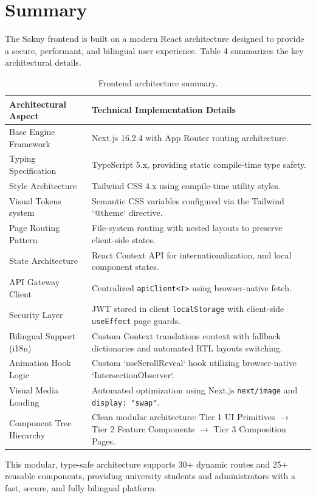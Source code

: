 \documentclass[12pt,a4paper]{article}
\begin{document}
\section{Summary}

The Sakny frontend is built on a modern React architecture designed to provide a secure, performant, and bilingual user experience. Table 4 summarizes the key architectural details.

\begin{table}[H]
\centering
\begin{tabular}{@{}lp{8.5cm}@{}}
\toprule
\textbf{Architectural Aspect} & \textbf{Technical Implementation Details} \\
\midrule
Base Engine Framework & Next.js 16.2.4 with App Router routing architecture. \\
Typing Specification & TypeScript 5.x, providing static compile-time type safety. \\
Style Architecture & Tailwind CSS 4.x using compile-time utility styles. \\
Visual Tokens system & Semantic CSS variables configured via the Tailwind `@theme` directive. \\
Page Routing Pattern & File-system routing with nested layouts to preserve client-side states. \\
State Architecture & React Context API for internationalization, and local component states. \\
API Gateway Client & Centralized \texttt{apiClient<T>} using browser-native fetch. \\
Security Layer & JWT stored in client \texttt{localStorage} with client-side \texttt{useEffect} page guards. \\
Bilingual Support (i18n) & Custom Context translations context with fallback dictionaries and automated RTL layouts switching. \\
Animation Hook Logic & Custom `useScrollReveal` hook utilizing browser-native `IntersectionObserver`. \\
Visual Media Loading & Automated optimization using Next.js \texttt{next/image} and \texttt{display: "swap"}. \\
Component Tree Hierarchy & Clean modular architecture: Tier 1 UI Primitives $\rightarrow$ Tier 2 Feature Components $\rightarrow$ Tier 3 Composition Pages. \\
\bottomrule
\end{tabular}
\caption{Frontend architecture summary.}
\end{table}

This modular, type-safe architecture supports 30+ dynamic routes and 25+ reusable components, providing university students and administrators with a fast, secure, and fully bilingual platform.
\end{document}

